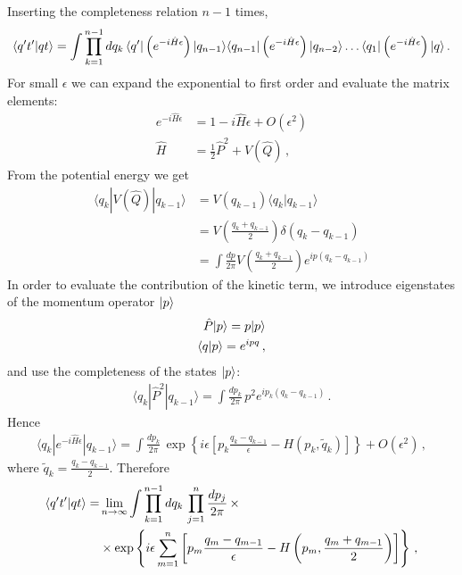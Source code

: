 Inserting the completeness relation $n-1$ times,
\begin{align}
  \label{eq:AmplitudeStepOne}
  \langle q't' | qt \rangle = \int \prod_{k=1}^{n-1}dq_k\,
  \langle q' | \left(e^{-i \hat{H} \epsilon}\right) |q_{n-1}\rangle
  \langle q_{n-1} | \left(e^{-i \hat{H} \epsilon}\right) |
  q_{n-2}\rangle \ldots \langle q_1 | \left(e^{-i \hat{H}
  \epsilon}\right) | q\rangle\, .
\end{align}
For small $\epsilon$ we can expand the exponential to first order and
evaluate the matrix elements:
\begin{align}
  e^{-i \hat{H} \epsilon} &= 1 - i \hat{H} \epsilon + O(\epsilon^2)\\
\hat{H} &= \frac12 \hat{P}^2 + V(\hat{Q})\, ,
\end{align}
From the potential energy we get
\begin{align}
  \langle q_k | V(\hat{Q}) | q_{k-1}\rangle &= V(q_{k-1}) \langle q_k
                                              | q_{k-1} \rangle \\
                                            &= V\left(\frac{q_k +
                                              q_{k-1}}{2}\right)
                                              \delta(q_k-q_{k-1}) \\
                                            & = \int \frac{dp}{2\pi} V\left(\frac{q_k +
                                              q_{k-1}}{2}\right) 
                                              e^{ip (q_k-q_{k-1})}
\end{align}
In order to evaluate the contribution of the kinetic term, we
introduce eigenstates of the momentum operator $| p \rangle$
\begin{align}
  \hat{P} | p \rangle = p | p \rangle \\
  \langle q | p \rangle = e^{ipq}\, ,
\end{align}
and use the completeness of the states $| p \rangle$:
\begin{align}
  \langle q_k | \hat{P}^2 | q_{k-1}\rangle = 
  \int \frac{dp_k}{2\pi}\, p^2 e^{ip_k(q_k-q_{k-1})}\, .
\end{align}
Hence
\begin{align}
  \langle q_k | e^{-i\hat{H}\epsilon} | q_{k-1}\rangle = 
  \int \frac{dp_k}{2\pi}\, \exp\left\{i\epsilon \left[
  p_k \frac{q_k-q_{k-1}}{\epsilon} - H\left(p_k,\tilde{q}_k\right)
  \right]
  \right\} + O(\epsilon^2)\, ,
\end{align}
where $\tilde{q}_k=\frac{q_k-q_{k-1}}{2}$. Therefore
\begin{align}
  \langle q't' | qt \rangle =& \lim_{n\to\infty} \int \prod_{k=1}^{n-1}dq_k\, 
  \prod_{j=1}^{n} \frac{dp_j}{2\pi}\, \times \\
  &\times \exp \left\{
    i\epsilon \sum_{m=1}^{n} \left[
    p_m \frac{q_m-q_{m-1}}{\epsilon} - H\left(p_m, 
    \frac{q_m+q_{m-1}}{2}\right)
    \right]
    \right\}\, ,
\end{align}
